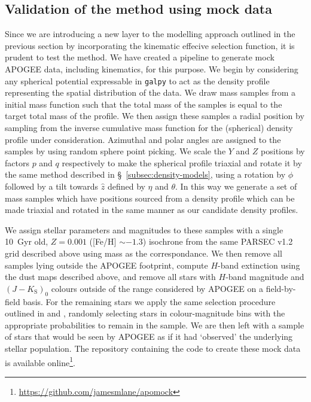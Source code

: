 \subsection{Validation of the method using mock data}
\label{subsec:method-validation}

Since we are introducing a new layer to the modelling approach outlined in the previous section by incorporating the kinematic effecive selection function, it is prudent to test the method. We have created a pipeline to generate mock APOGEE data, including kinematics, for this purpose. We begin by considering any spherical potential expressable in \texttt{galpy} to act as the density profile representing the spatial distribution of the data. We draw mass samples from a \textcite{chabrier03} initial mass function such that the total mass of the samples is equal to the target total mass of the profile. We then assign these samples a radial position by sampling from the inverse cumulative mass function for the (spherical) density profile under consideration. Azimuthal and polar angles are assigned to the samples by using random sphere point picking. We scale the $Y$ and $Z$ positions by factors $p$ and $q$ respectively to make the spherical profile triaxial and rotate it by the same method described in \S~\ref{subsec:density-models}, using a rotation by $\phi$ followed by a tilt towards $\hat{z}$ defined by $\eta$ and $\theta$. In this way we generate a set of mass samples which have positions sourced from a density profile which can be made triaxial and rotated in the same manner as our candidate density profiles.

We assign stellar parameters and magnitudes to these samples with a single 10~Gyr old, $Z=0.001$ ([Fe/H] $\sim -1.3$) isochrone from the same PARSEC v1.2 grid described above using mass as the correspondance. We then remove all samples lying outside the APOGEE footprint, compute $H$-band extinction using the dust maps described above, and remove all stars with $H$-band magnitude and $(J-K_\mathrm{S})_{0}$ colours outside of the range considered by APOGEE on a field-by-field basis. For the remaining stars we apply the same selection procedure outlined in \textcite{apogee_targeting} and \textcite{apogee2_targeting}, randomly selecting stars in colour-magnitude bins with the appropriate probabilities to remain in the sample. We are then left with a sample of stars that would be seen by APOGEE as if it had `observed' the underlying stellar population. The repository containing the code to create these mock data is available online\footnote{\url{https://github.com/jamesmlane/apomock}}.

